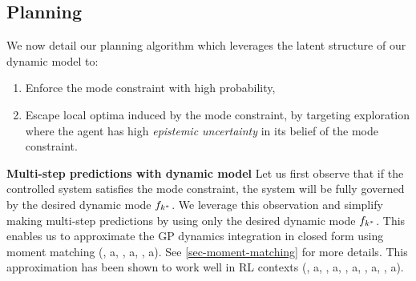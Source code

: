 \documentclass[twoside]{article}
\begin{document}
\subsection{Planning \label{sec-planning}}
\label{sec:org9ca74a8}
We now detail our planning algorithm which leverages the latent structure of our dynamic model to:
\begin{enumerate}
\item Enforce the mode constraint with high probability,
\item Escape local optima induced by the mode constraint, by targeting exploration where the agent has high \emph{epistemic uncertainty} in its belief of the mode constraint.
\end{enumerate}

\textbf{Multi-step predictions with dynamic model}
Let us first observe that if the controlled system satisfies the mode constraint, the system will be fully
governed by the desired dynamic mode \(f_{k^{*}}\).
We leverage this observation and simplify making multi-step predictions by using only the desired
dynamic mode \(f_{k^{*}}\).
This enables us to approximate the GP dynamics integration in closed form using moment matching
(, a, , a, , a).
See \cref{sec-moment-matching} for more details.
This approximation has been shown to work well in RL
contexts (, a, , a, , a, , a, , a).
\end{document}
